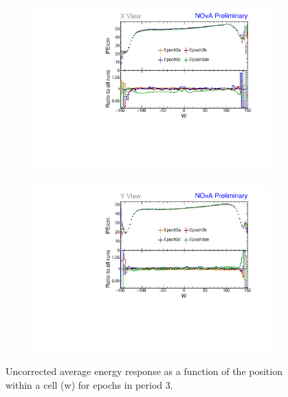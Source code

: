 \begin{figure}[!hbtp]
\centering
\begin{subfigure}[b]{0.495\textwidth}
\centering
\includegraphics[width=\textwidth]{PlotsTBCalibTechnote/Attenprofs_P3Data_WPE_corr_xy_X_Combined.pdf}
\end{subfigure}
\begin{subfigure}[b]{0.495\textwidth}
\centering
\includegraphics[width=\textwidth]{PlotsTBCalibTechnote/Attenprofs_P3Data_WPE_corr_xy_Y_Combined.pdf}
\end{subfigure}
\caption{Uncorrected average energy response as a function of the position within a cell (w) for epochs in period 3.}
\label{fig:CalibhistWPE_period3}
\end{figure}

